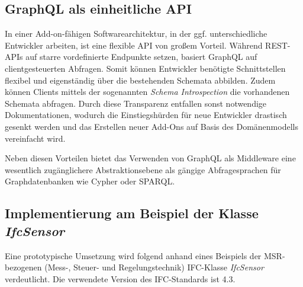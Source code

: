 \subsection{GraphQL als einheitliche API} \label{sec:standard_api}
In einer Add-on-fähigen Softwarearchitektur, in der ggf. unterschiedliche Entwickler arbeiten, ist eine flexible API von großem Vorteil. Während REST-APIs auf starre vordefinierte Endpunkte setzen, basiert GraphQL auf clientgesteuerten Abfragen. Somit können
Entwickler benötigte Schnittstellen flexibel und eigenständig über die bestehenden Schemata abbilden. Zudem können Clients mittels der sogenannten \textit{Schema Introspection} die vorhandenen Schemata abfragen. Durch diese Transparenz entfallen sonst notwendige
Dokumentationen, wodurch die Einstiegshürden für neue Entwickler drastisch gesenkt werden und das Erstellen neuer Add-Ons auf Basis des Domänenmodells vereinfacht wird.

Neben diesen Vorteilen bietet das Verwenden von GraphQL als Middleware eine wesentlich zugänglichere Abstraktionsebene als gängige Abfragesprachen für Graphdatenbanken wie Cypher oder SPARQL.
\subsection{Implementierung am Beispiel der Klasse \textit{IfcSensor}}
Eine prototypische Umsetzung wird folgend anhand eines Beispiels der MSR-bezogenen (Mess-, Steuer- und Regelungstechnik) IFC-Klasse \textit{IfcSensor} verdeutlicht. Die verwendete Version des IFC-Standards ist 4.3.
